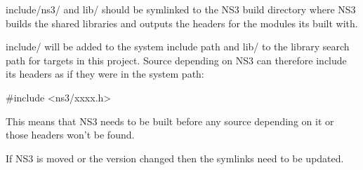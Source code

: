 {\ttfamily include/ns3/} and {\ttfamily lib/} should be symlinked to the N\-S3 build directory where N\-S3 builds the shared libraries and outputs the headers for the modules its built with.

{\ttfamily include/} will be added to the system include path and {\ttfamily lib/} to the library search path for targets in this project. Source depending on N\-S3 can therefore include its headers as if they were in the system path\-: \begin{DoxyVerb}#include <ns3/xxxx.h>
\end{DoxyVerb}


This means that N\-S3 needs to be built before any source depending on it or those headers won't be found.

If N\-S3 is moved or the version changed then the symlinks need to be updated. 